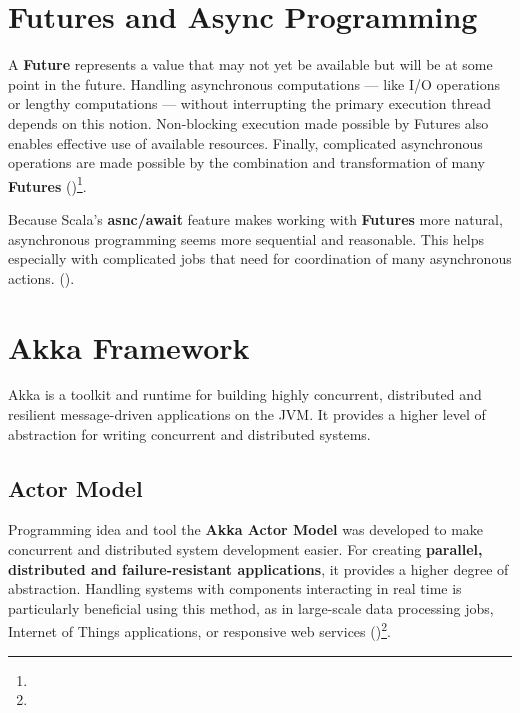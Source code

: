 \section{Futures and Async Programming}

A \textbf{Future} represents a value that may not yet be available but will be at some point in the future. Handling asynchronous computations — like I/O operations or lengthy computations — without interrupting the primary execution thread depends on this notion. Non-blocking execution made possible by Futures also enables effective use of available resources. Finally, complicated asynchronous operations are made possible by the combination and transformation of many \textbf{Futures} (\cite{futures})\footnote[32]{}.



Because Scala's \textbf{asnc/await} feature makes working with \textbf{Futures} more natural, asynchronous programming seems more sequential and reasonable. This helps especially with complicated jobs that need for coordination of many asynchronous actions. (\cite{futures})\footnotemark[32].







\section{Akka Framework}

Akka is a toolkit and runtime for building highly concurrent, distributed and resilient message-driven applications on the JVM. It provides a higher level of abstraction for writing concurrent and distributed systems.

\subsection{Actor Model}

Programming idea and tool the \textbf{Akka Actor Model} was developed to make concurrent and distributed system development easier. For creating \textbf{parallel, distributed and failure-resistant applications}, it provides a higher degree of abstraction. Handling systems with components interacting in real time is particularly beneficial using this method, as in large-scale data processing jobs, Internet of Things applications, or responsive web services (\cite{kuhnReactiveDesignPatterns2017})\footnote[33]{}.

